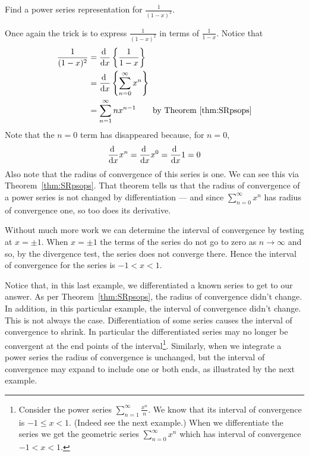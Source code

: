 \begin{eg}[$\frac{1}{(1-x)^2}$]\label{eg:SRpsrepB}
Find a power series representation for $\frac{1}{(1-x)^2}$.

\soln
Once again the trick is to express $\frac{1}{(1-x)^2}$ in terms of
$\frac{1}{1-x}$. Notice that
\begin{align*}
\frac{1}{(1-x)^2} &= \diff{}{x}\left\{\frac{1}{1-x}\right\} \\
             &= \diff{}{x} \left\{\sum_{n=0}^\infty x^n \right\}\\
             &= \sum_{n=1}^\infty nx^{n-1}
             \qquad\text{by Theorem \ref{thm:SRpsops}}
\end{align*}
Note that the $n=0$ term has disappeared because, for $n=0$,
\begin{equation*}
\diff{}{x} x^n = \diff{}{x} x^0 = \diff{}{x} 1= 0
\end{equation*}
Also note that the radius of convergence of this series is one. We can
see this via Theorem~\ref{thm:SRpsops}. That theorem tells us that
the radius of convergence of a power series is not changed by
differentiation --- and since $\sum_{n=0}^\infty x^n$ has radius
of convergence one, so too does its derivative.

Without much more work we can determine the interval of convergence
by testing at $x=\pm 1$. When $x=\pm 1$ the terms of the series do not
go to zero as $n \to \infty$ and so, by the divergence test, the series
does not converge there. Hence the interval of convergence for the
series is $-1 < x < 1$.
\end{eg}
Notice that, in this last example, we differentiated a known series to get
to our answer. As per Theorem~\ref{thm:SRpsops}, the radius of convergence
didn't change. In addition, in this particular example, the interval
of convergence didn't change. This is not always the case.
Differentiation of some series causes the interval of convergence to shrink.
In particular the differentiated series may no longer be convergent
at the end points of the interval\footnote{Consider the power series
$\sum_{n=1}^\infty \frac{x^n}{n}$. We know that its interval of
convergence is $-1 \leq x < 1$. (Indeed see the next example.) When
we differentiate the series we get the geometric series
$\sum_{n=0}^\infty x^n$ which has interval of convergence $-1<x<1$. }. Similarly, when we integrate a power series the radius of convergence is
unchanged, but the interval of convergence may expand to include one or both ends, as illustrated by the next example.


